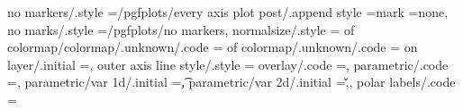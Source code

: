 {{{{{{{{{{{{{{{{{{{{{{{{{{{{{{{{{{{no markers/.style                                                  ={/pgfplots/every axis plot post/.append style                                                                                      ={mark                                                     =none}},                                                                                                                  
no marks/.style                                                    ={/pgfplots/no markers},                                                                                                            
normalsize/.style                                                  ={                                                                                                                                  
of colormap/colormap/.unknown/.code                                ={%
of colormap/.unknown/.code                                         ={%
on layer/.initial                                                  =,                                                                                                                                  
outer axis line style/.style                                       ={                                                                                                                                  
overlay/.code                                                      ={},                                                   
parametric/.code                                                   ={},%
parametric/var 1d/.initial                                         =\t,                                                                                                                                
parametric/var 2d/.initial                                         ={\u,\v},                                                                                                                           
polar labels/.code                                                 ={                                                                                                                                  
}}}}}}}}}}}}}}}}}}}}}}}}}}}}}}}}}}}}}}}}
